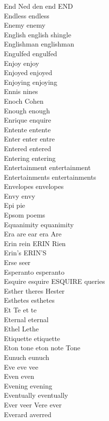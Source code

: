 End Ned den end END\\
Endless endless\\
Enemy enemy\\
English english shingle\\
Englishman englishman\\
Engulfed engulfed\\
Enjoy enjoy\\
Enjoyed enjoyed\\
Enjoying enjoying\\
Ennis nines\\
Enoch Cohen\\
Enough enough\\
Enrique enquire\\
Entente entente\\
Enter enter entre\\
Entered entered\\
Entering entering\\
Entertainment entertainment\\
Entertainments entertainments\\
Envelopes envelopes\\
Envy envy\\
Epi pie\\
Epsom poems\\
Equanimity equanimity\\
Era are ear era Are\\
Erin rein ERIN Rien\\
Erin's ERIN'S\\
Erse seer\\
Esperanto esperanto\\
Esquire esquire ESQUIRE queries\\
Esther theres Hester\\
Esthetes esthetes\\
Et Te et te\\
Eternal eternal\\
Ethel Lethe\\
Etiquette etiquette\\
Eton tone eton note Tone\\
Eunuch eunuch\\
Eve eve vee\\
Even even\\
Evening evening\\
Eventually eventually\\
Ever veer Vere ever\\
Everard averred\\
